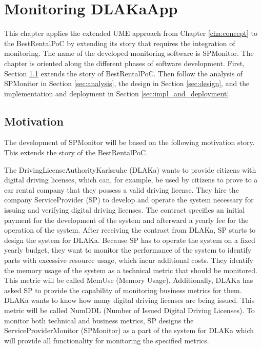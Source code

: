 \chapter{Monitoring DLAKaApp}
\label{cha:first_solution}

This chapter applies the extended UME approach from Chapter \ref{cha:concept} to the BestRentalPoC
by extending its story that requires the integration of monitoring. The name of the developed monitoring
software is SPMonitor. The chapter is oriented along the different phases of software development.
First, Section \ref{sec:motivation} extends the story of BestRentalPoC.
Then follow the analysis of SPMonitor in Section \ref{sec:analysis}, the design in Section \ref{sec:design},
and the implementation and deployment in Section \ref{sec:impl_and_deployment}.

\section{Motivation}
\label{sec:motivation}

The development of SPMonitor will be based on the following motivation story.
This extends the story of the BestRentalPoC.

The DrivingLicenseAuthorityKarlsruhe (DLAKa) wants to provide citizens with digital driving licenses,
which can, for example, be used by citizens to prove to a car rental company that they possess a valid driving license.
They hire the company ServiceProvider (SP) to develop and operate the system necessary for issuing and verifying
digital driving licenses. The contract specifies an initial payment for the development of the system
and afterward a yearly fee for the operation of the system.
After receiving the contract from DLAKa, SP starts to design the system
for DLAKa. Because SP has to operate the system on a fixed yearly budget,
they want to monitor the performance of the system to identify parts with excessive resource usage, which
incur additional costs. They identify the memory usage of the system as a technical metric that should be monitored.
This metric will be called MemUse (Memory Usage).
Additionally, \Gls{DLAKa} has asked SP to provide the capability of monitoring business metrics for them.
\Gls{DLAKa} wants to know how many digital driving licenses are being issued. 
This metric will be called NumDDL (Number of Issued Digital Driving Licenses).
To monitor both technical and business metrics, SP designs the ServiceProviderMonitor (SPMonitor) as a part
of the system for \Gls{DLAKa} which will provide all functionality for monitoring the specified metrics.

